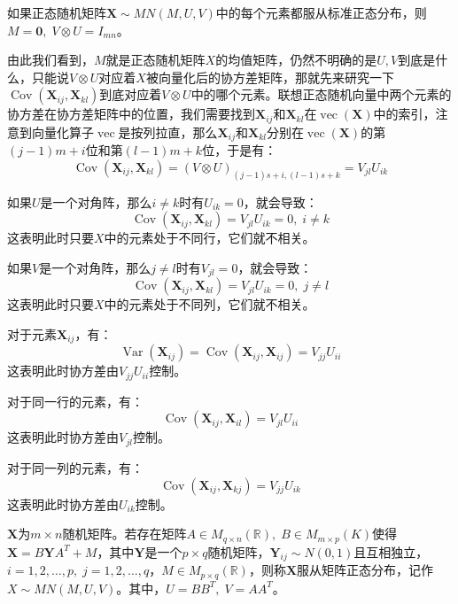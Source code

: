 \begin{corollary}
	如果正态随机矩阵$\mathbf{X}\sim MN(M,U,V)$中的每个元素都服从标准正态分布，则$M=\mathbf{0},\;V\otimes U=I_{mn}$。
\end{corollary}
由此我们看到，$M$就是正态随机矩阵$X$的均值矩阵，仍然不明确的是$U,V$到底是什么，只能说$V\otimes U$对应着$X$被向量化后的协方差矩阵，那就先来研究一下$\operatorname{Cov}(\mathbf{X}_{ij},\mathbf{X}_{kl})$到底对应着$V\otimes U$中的哪个元素。联想正态随机向量中两个元素的协方差在协方差矩阵中的位置，我们需要找到$\mathbf{X}_{ij}$和$\mathbf{X}_{kl}$在$\operatorname{vec}(\mathbf{X})$中的索引，注意到向量化算子$\operatorname{vec}$是按列拉直，那么$\mathbf{X}_{ij}$和$\mathbf{X}_{kl}$分别在$\operatorname{vec}(\mathbf{X})$的第$(j-1)m+i$位和第$(l-1)m+k$位，于是有：
\begin{equation*}
	\operatorname{Cov}(\mathbf{X}_{ij},\mathbf{X}_{kl})=(V\otimes U)_{(j-1)s+i,(l-1)s+k}=V_{jl}U_{ik}
\end{equation*}\par
如果$U$是一个对角阵，那么$i\ne k$时有$U_{ik}=0$，就会导致：
\begin{equation*}
	\operatorname{Cov}(\mathbf{X}_{ij},\mathbf{X}_{kl})=V_{jl}U_{ik}=0,\;i\ne k
\end{equation*}
这表明此时只要$X$中的元素处于不同行，它们就不相关。\par
如果$V$是一个对角阵，那么$j\ne l$时有$V_{jl}=0$，就会导致：
\begin{equation*}
	\operatorname{Cov}(\mathbf{X}_{ij},\mathbf{X}_{kl})=V_{jl}U_{ik}=0,\;j\ne l
\end{equation*}
这表明此时只要$X$中的元素处于不同列，它们就不相关。\par
对于元素$\mathbf{X}_{ij}$，有：
\begin{equation*}
	\operatorname{Var}(\mathbf{X}_{ij})=\operatorname{Cov}(\mathbf{X}_{ij},\mathbf{X}_{ij})=V_{jj}U_{ii}
\end{equation*}
这表明此时协方差由$V_{jj}U_{ii}$控制。\par
对于同一行的元素，有：
\begin{equation*}
	\operatorname{Cov}(\mathbf{X}_{ij},\mathbf{X}_{il})=V_{jl}U_{ii}
\end{equation*}
这表明此时协方差由$V_{jl}$控制。\par
对于同一列的元素，有：
\begin{equation*}
	\operatorname{Cov}(\mathbf{X}_{ij},\mathbf{X}_{kj})=V_{jj}U_{ik}
\end{equation*}
这表明此时协方差由$U_{ik}$控制。
\begin{definition}\label{def:MatNormal3}
	$\mathbf{X}$为$m\times n$随机矩阵。若存在矩阵$A\in M_{q\times n}(\mathbb{R}),\;B\in M_{m\times p}(K)$使得$\mathbf{X}=B\mathbf{Y}A^T+M$，其中$\mathbf{Y}$是一个$p\times q$随机矩阵，$\mathbf{Y}_{ij}\sim N(0,1)$且互相独立，$i=1,2,\dots,p,\;j=1,2,\dots,q$，$M\in M_{p\times q}(\mathbb{R})$，则称$\mathbf{X}$服从矩阵正态分布，记作$X\sim MN(M,U,V)$。其中，$U=BB^T,\;V=AA^T$。
\end{definition}
